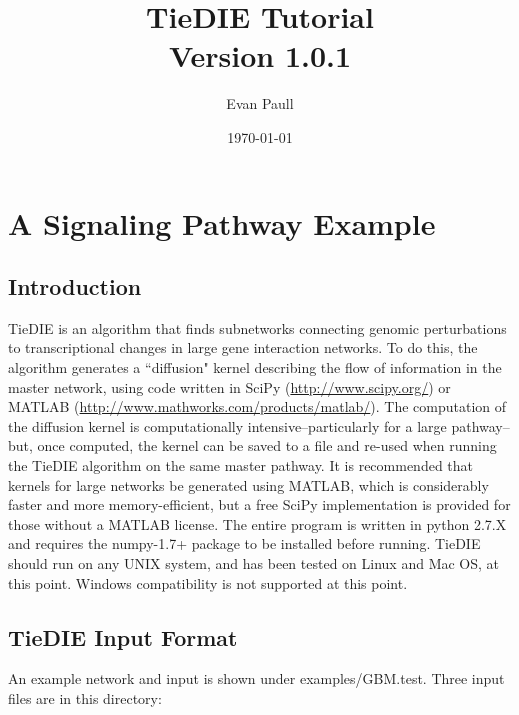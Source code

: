 \documentclass[11pt]{report}
\author{Evan Paull \emailaddr{epaull@soe.ucsc.edu}}
\title{TieDIE Tutorial \\ Version 1.0.1}
\date{\today}
\begin{document}
\maketitle

\tableofcontents

\singlespace

\chapter{A Signaling Pathway Example}

\section{Introduction}

\noindent TieDIE is an algorithm that finds subnetworks connecting genomic perturbations to transcriptional changes in 
large gene interaction networks. To do this, the algorithm generates a ``diffusion" kernel describing
the flow of information in the master network, using code written in SciPy (\url{http://www.scipy.org/}) or 
 MATLAB (\url{http://www.mathworks.com/products/matlab/}). The computation of the diffusion kernel is computationally
intensive--particularly for a large pathway--but, once computed, the kernel can be saved to a file and re-used
when running the TieDIE algorithm on the same master pathway. It is recommended that kernels for large networks
be generated using MATLAB, which is considerably faster and more memory-efficient, but a free SciPy implementation is 
provided for those without a MATLAB license. The entire program is written in python 2.7.X and requires the numpy-1.7+
package to be installed before running. TieDIE should run on any UNIX system, and has been tested on Linux and Mac OS, at this 
point. Windows compatibility is not supported at this point. 

\section{TieDIE Input Format}

\noindent An example network and input is shown under examples/GBM.test. Three input files are in this directory: 
\end{document}
